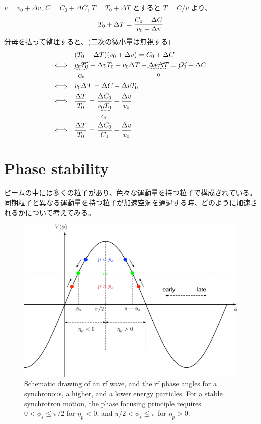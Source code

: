 \documentclass[10pt,a4paper]{ltjsarticle}
\begin{document}
\begin{tcolorbox}[title=式 (\ref{delta_T}) の導出]
    $v = v_0 + \Delta v$, $C=C_0 + \Delta C$, $T = T_0 + \Delta T$ とすると $T = C/v$ より、
    \begin{equation}
        T_0 + \Delta T = \frac{C_0 + \Delta C}{v_0 + \Delta v} \notag
    \end{equation}
    分母を払って整理すると、(二次の微小量は無視する)
    \begin{align}
        & (T_0 + \Delta T)(v_0 + \Delta v) = C_0 + \Delta C \notag \\
        \Longleftrightarrow\quad & \underset{C_0}{\uwave{\cancel{v_0 T_0}}} + \Delta v T_0 + v_0 \Delta T +
        \underset{0}{\uwave{\cancel{\Delta v \Delta T}}}
        = \cancel{C_0} + \Delta C \notag \\
        \Longleftrightarrow\quad & v_0 \Delta T = \Delta C- \Delta v T_0 \notag \\
        \Longleftrightarrow\quad & \frac{\Delta T}{T_0} = \frac{\Delta C_0}{\underset{C_0}{\uwave{v_0 T_0}}} - \frac{\Delta v}{v_0} \notag \\
        \Longleftrightarrow\quad & \frac{\Delta T}{T_0} = \frac{\Delta C_0}{C_0} - \frac{\Delta v}{v_0} \notag
    \end{align}
\end{tcolorbox}


\section{Phase stability}
ビームの中には多くの粒子があり、色々な運動量を持つ粒子で構成されている。同期粒子と異なる運動量を持つ粒子が加速空洞を通過する時、どのように加速されるかについて考えてみる。
%
\begin{figure}[hbt]
    \begin{center}
      \includegraphics[width=15cm,clip]{figs/phase_stability.pdf}
      \caption{Schematic drawing of an rf wave, and the rf phase angles for a synchronous, a higher, and a lower energy particles.
      For a stable synchrotron motion, the phase focusing principle requires $0 < \phi_s \leq \pi/2$ for $\eta_p < 0$,
      and $\pi/2 < \phi_s \leq \pi$ for $\eta_p > 0$.}
      \label{phase_stability}
    \end{center}
\end{figure}
\end{document}

